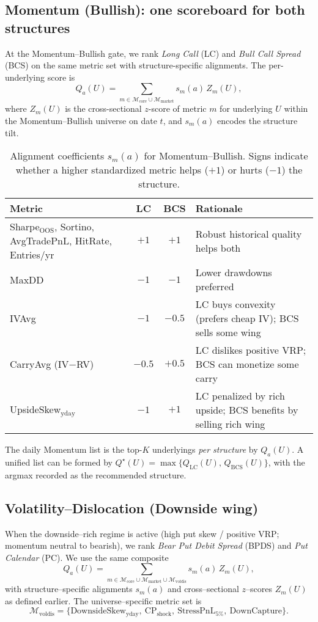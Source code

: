 \documentclass[12pt,a4paper]{report}
\begin{document}
\subsection{Momentum (Bullish): one scoreboard for both structures}
At the Momentum–Bullish gate, we rank \emph{Long Call} (LC) and \emph{Bull Call Spread} (BCS) on the same metric set with structure-specific alignments. The per-underlying score is
\[
Q_a(U)=\sum_{m\in \mathcal{M}_{\text{core}}\cup\mathcal{M}_{\text{market}}} s_m(a)\, Z_m(U),
\]
where $Z_m(U)$ is the cross-sectional $z$-score of metric $m$ for underlying $U$ within the Momentum–Bullish universe on date $t$, and $s_m(a)$ encodes the structure tilt.

\begin{table}[h]
\centering
\begin{tabular}{lccp{6.5cm}}
\toprule
\textbf{Metric} & \textbf{LC} & \textbf{BCS} & \textbf{Rationale} \\
\midrule
Sharpe$_{\text{OOS}}$, Sortino, AvgTradePnL, HitRate, Entries/yr & $+1$ & $+1$ & Robust historical quality helps both \\
MaxDD & $-1$ & $-1$ & Lower drawdowns preferred \\
IVAvg & $-1$ & $-0.5$ & LC buys convexity (prefers cheap IV); BCS sells some wing \\
CarryAvg (IV$-$RV) & $-0.5$ & $+0.5$ & LC dislikes positive VRP; BCS can monetize some carry \\
UpsideSkew$_{\text{yday}}$ & $-1$ & $+1$ & LC penalized by rich upside; BCS benefits by selling rich wing \\
\bottomrule
\end{tabular}
\caption{Alignment coefficients $s_m(a)$ for Momentum–Bullish. Signs indicate whether a higher standardized metric helps ($+1$) or hurts ($-1$) the structure.}
\label{tab:align-momentum}
\end{table}

\noindent The daily Momentum list is the top-$K$ underlyings \emph{per structure} by $Q_a(U)$. A unified list can be formed by $Q^\star(U)=\max\{Q_{\text{LC}}(U),\,Q_{\text{BCS}}(U)\}$, with the argmax recorded as the recommended structure.


\subsection{Volatility–Dislocation (Downside wing)}
When the downside–rich regime is active (high put skew / positive VRP; momentum neutral to bearish), we rank \emph{Bear Put Debit Spread} (BPDS) and \emph{Put Calendar} (PC). We use the same composite
\[
Q_a(U)=\sum_{m\in \mathcal{M}_{\text{core}}\cup\mathcal{M}_{\text{market}}\cup\mathcal{M}_{\text{voldis}}} s_m(a)\, Z_m(U),
\]
with structure–specific alignments $s_m(a)$ and cross–sectional $z$–scores $Z_m(U)$ as defined earlier. The universe–specific metric set is
\[
\mathcal{M}_{\text{voldis}}=\{\mathrm{DownsideSkew}_{\text{yday}},\ \mathrm{CP}_{\text{shock}},\ \mathrm{StressPnL}_{5\%},\ \mathrm{DownCapture}\}.
\]
\end{document}

